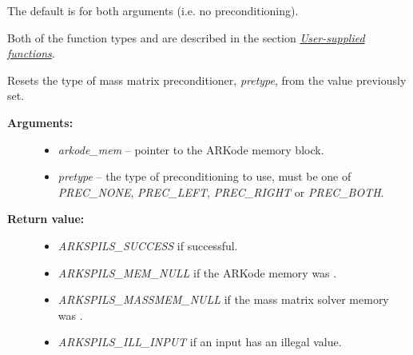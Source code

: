 \documentclass[letterpaper,10pt,english]{sphinxmanual}
\begin{document}
\begin{fulllineitems}
The default is  for both arguments (i.e. no
preconditioning).

Both of the function types {\hyperref[c_interface/User_supplied:ARKSpilsMassPrecSetupFn]{}} and
{\hyperref[c_interface/User_supplied:ARKSpilsMassPrecSolveFn]{}} are described in the section
{\hyperref[c_interface/User_supplied:cinterface-usersupplied]{\emph{User-supplied functions}}}.

\end{fulllineitems}


\begin{fulllineitems}
\label{c_interface/User_callable:ARKSpilsSetMassPrecType}
Resets the type of mass matrix preconditioner, \emph{pretype}, from the value previously set.
\begin{description}
\item[{\textbf{Arguments:}}] \leavevmode\begin{itemize}
\item {} 
\emph{arkode\_mem} -- pointer to the ARKode memory block.

\item {} 
\emph{pretype} -- the type of preconditioning to use, must be one of
\emph{PREC\_NONE}, \emph{PREC\_LEFT}, \emph{PREC\_RIGHT} or \emph{PREC\_BOTH}.

\end{itemize}

\item[{\textbf{Return value:}}] \leavevmode\begin{itemize}
\item {} 
\emph{ARKSPILS\_SUCCESS} if successful.

\item {} 
\emph{ARKSPILS\_MEM\_NULL} if the ARKode memory was .

\item {} 
\emph{ARKSPILS\_MASSMEM\_NULL} if the mass matrix solver memory was .

\item {} 
\emph{ARKSPILS\_ILL\_INPUT} if an input has an illegal value.

\end{itemize}

\end{description}


\end{fulllineitems}
\end{document}
